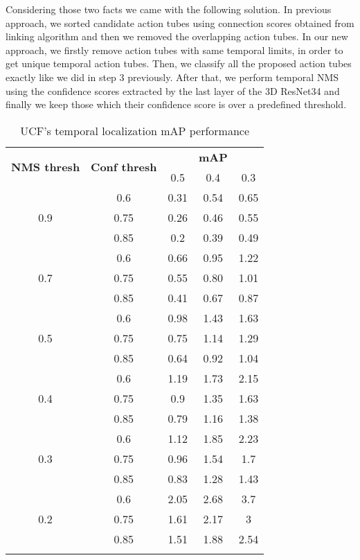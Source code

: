 Considering those two facts we came with the following solution.
In previous approach, we sorted candidate action tubes using connection scores obtained from linking algorithm and then we removed
the overlapping action tubes. In our new approach, we firstly remove action tubes with same temporal limits, in order to get unique
temporal action tubes. Then, we classify all the proposed action tubes exactly like we did in step 3 previously. After that, we
perform temporal NMS using the confidence scores extracted by the last layer of the 3D ResNet34 and finally we keep those which
their confidence score is over a predefined threshold. 

\begin{center}
  \begin{longtable}{|| c | c || c c c ||}

    \hline
    \multirow{2}{*}{\textbf{NMS thresh}} & \multirow{2}{*}{\textbf{Conf thresh}} & {} & \textbf{mAP} & {}  \\
    {} & {} & 0.5 & 0.4 & 0.3\\
    \hline
    \multirow{3}{*}{0.9} & {0.6} & 0.31 & 0.54 & 0.65 \\
    \cline{2-5}
    {} & {0.75} & 0.26 & 0.46 & 0.55 \\
    \cline{2-5}
    {} & {0.85} & 0.2 & 0.39 & 0.49 \\
    \hline
    \multirow{3}{*}{0.7} & {0.6} & 0.66 & 0.95 & 1.22 \\
    \cline{2-5}
    {} & {0.75} & 0.55 & 0.80 & 1.01 \\
    \cline{2-5}
    {} & {0.85} & 0.41 & 0.67 & 0.87 \\
    \hline
    \multirow{3}{*}{0.5} & {0.6} & 0.98 & 1.43 & 1.63 \\
    \cline{2-5}
    {} & {0.75} & 0.75 & 1.14 & 1.29 \\
    \cline{2-5}
    {} & {0.85} & 0.64 & 0.92 & 1.04 \\
    \hline
    \multirow{3}{*}{0.4} & {0.6} & 1.19 & 1.73 & 2.15 \\
    \cline{2-5}
    {} & {0.75} & 0.9 & 1.35 & 1.63 \\
    \cline{2-5}
    {} & {0.85} & 0.79 & 1.16 & 1.38 \\

    \hline
    \multirow{3}{*}{0.3} & {0.6} & 1.12 & 1.85 & 2.23 \\
    \cline{2-5}
    {} & {0.75} & 0.96 & 1.54 &1.7 \\
    \cline{2-5}
    {} & {0.85} & 0.83 & 1.28 & 1.43 \\
    \hline
    \multirow{3}{*}{0.2} & {0.6} & 2.05 & 2.68 & 3.7 \\
    \cline{2-5}
    {} & {0.75} & 1.61 & 2.17 & 3 \\
    \cline{2-5}
    {} & {0.85} & 1.51 & 1.88 & 2.54 \\

    \hline

    \caption{UCF's temporal localization mAP performance}
    \label{table:temp_cls_2}
  \end{longtable}
\end{center}

